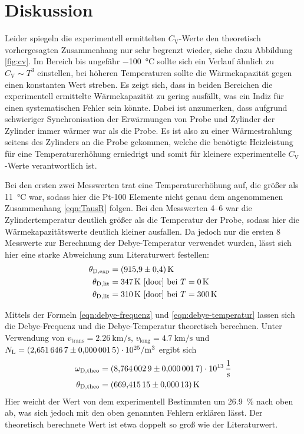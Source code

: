 \section{Diskussion}
\label{sec:Diskussion}

Leider spiegeln die experimentell ermittelten $C_\text{V}$-Werte den
theoretisch vorhergesagten Zusammenhang nur sehr begrenzt wieder, siehe
dazu Abbildung \ref{fig:cv}. Im Bereich bis ungefähr \SI{-100}{\celsius} sollte sich
ein Verlauf ähnlich zu $C_\text{V} \sim T^3$ einstellen, bei höheren
Temperaturen sollte die Wärmekapazität gegen einen konstanten Wert
streben. Es zeigt sich, dass in beiden Bereichen die experimentell
ermittelte Wärmekapazität zu gering ausfällt, was ein Indiz für einen
systematischen Fehler sein könnte. Dabei ist anzumerken, dass aufgrund
schwieriger Synchronisation der Erwärmungen von Probe und Zylinder
der Zylinder immer wärmer war als die Probe. Es ist also zu einer
Wärmestrahlung seitens des Zylinders an die Probe gekommen, welche die benötigte
Heizleistung für eine Temperaturerhöhung erniedrigt und somit für kleinere
experimentelle $C_\text{V}$-Werte verantwortlich ist.

Bei den ersten zwei Messwerten trat eine Temperaturerhöhung auf, die
größer als \SI{11}{\celsius} war, sodass hier die Pt-100 Elemente nicht
genau dem angenommenen Zusammenhang \eqref{eqn:TausR} folgen. Bei den Messwerten
\numrange{4}{6} war die Zylindertemperatur deutlich größer als die
Temperatur der Probe, sodass hier die Wärmekapazitätswerte deutlich kleiner
ausfallen. Da jedoch nur die ersten \num{8} Messwerte zur Berechnung der
Debye-Temperatur verwendet wurden, lässt sich hier eine starke Abweichung
zum Literaturwert festellen:
\begin{align*}
    \theta_\text{D,exp} &= \SI{915.9(4)}{\kelvin} \\
    \theta_\text{D,lit} &= \SI{347}{\kelvin} \text{ \cite{door} bei }T = \SI{0}{\kelvin} \\
    \theta_\text{D,lit} &= \SI{310}{\kelvin} \text{ \cite{door} bei }T = \SI{300}{\kelvin}
\end{align*}

Mittels der Formeln
\eqref{eqn:debye-frequenz} und \eqref{eqn:debye-temperatur}
lassen sich die Debye-Frequenz und die Debye-Temperatur theoretisch
berechnen. Unter Verwendung von
$v_\text{trans}=\SI{2.26}{\kilo\meter\per\second}$,
$v_\text{long}=\SI{4.7}{\kilo\meter\per\second}$ \cite[p.~5]{anleitung}
und $N_\text{L}=\SI{2.6516467(15)e25}{\raiseto{-3}\meter}$ \cite{Codata}
ergibt sich
\begin{align*}
    \omega_\text{D,theo} &= \SI{8.7640029(17)e+13}{\raiseto{-1}\second} \\
    \theta_\text{D,theo} &= \SI{669.41515(13)}{\kelvin}
\end{align*}
Hier weicht der Wert von dem experimentell Bestimmten um \SI{26.9}{\percent}
nach oben ab, was sich jedoch mit den oben genannten Fehlern erklären lässt.
Der theoretisch berechnete Wert ist etwa doppelt so groß wie der Literaturwert.

